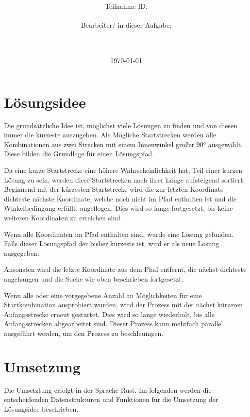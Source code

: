 \documentclass[a4paper,10pt,ngerman]{scrartcl}
\title{\textbf{\Huge\Aufgabe}}
\author{\LARGE Teilnahme-ID: \LARGE \TeilnahmeId \\\\
	    \LARGE Bearbeiter/-in dieser Aufgabe: \\ 
	    \LARGE \Name\\\\}
\date{\LARGE\today}
\begin{document}
\maketitle
\tableofcontents

\vspace{0.5cm}

\section{Lösungsidee}
Die grundsätzliche Idee ist, möglichst viele Lösungen zu finden und von diesen immer die kürzeste auszugeben. Als Mögliche Startstrecken werden alle Kombinationen aus zwei Strecken mit einem Innenwinkel größer 90° ausgewählt. Diese bilden die Grundlage für einen Lösungspfad.

Da eine kurze Startstrecke eine höhere Wahrscheinlichkeit hat, Teil einer kurzen Lösung zu sein, werden diese Startstrecken nach ihrer Länge aufsteigend sortiert. Beginnend mit der kürzesten Startstrecke wird die zur letzten Koordinate dichteste nächste Koordinate, welche noch nicht im Pfad enthalten ist und die Winkelbedingung erfüllt, angeflogen. Dies wird so lange fortgesetzt, bis keine weiteren Koordinaten zu erreichen sind. 

Wenn alle Koordinaten im Pfad enthalten sind, wurde eine Lösung gefunden. Falls dieser Lösungspfad der bisher kürzeste ist, wird er als neue Lösung ausgegeben.

Ansonsten wird die letzte Koordinate aus dem Pfad entfernt, die nächst dichteste angehangen und die Suche wie oben beschrieben fortgesetzt.

Wenn alle oder eine vorgegebene Anzahl an Möglichkeiten für eine Startkombination ausprobiert wurden, wird der Prozess mit der nächst kürzeren Anfangsstrecke erneut gestartet. Dies wird so lange wiederholt, bis alle Anfangsstrecken abgearbeitet sind. Dieser Prozess kann mehrfach parallel ausgeführt werden, um den Prozess zu beschleunigen. 

\newpage 
\section{Umsetzung}
Die Umsetztung erfolgt in der Sprache Rust. Im folgenden werden die entscheidenden Datenstrukturen und Funktionen für die Umsetzung der Lösungsidee beschrieben.


\end{document}
